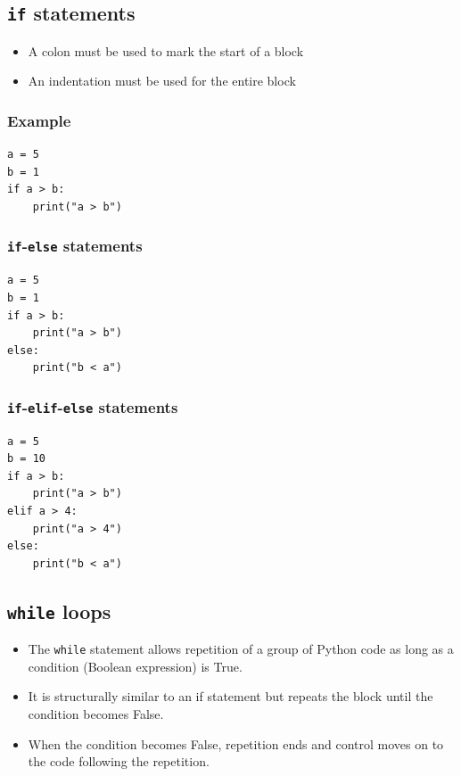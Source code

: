 \documentclass[11pt]{article}
\begin{document}
 \newpage

\subsection{\texttt{if} statements}
\label{sec:org6fc6a0c}
\begin{itemize}
\item A colon must be used to mark the start of a block
\item An indentation must be used for the entire block
\end{itemize}

\subsubsection{Example}
\label{sec:orga4df9d3}
\begin{verbatim}
a = 5
b = 1
if a > b:
    print("a > b")
\end{verbatim}

\subsubsection{\texttt{if}-\texttt{else} statements}
\label{sec:org3017435}
\begin{verbatim}
a = 5
b = 1
if a > b:
    print("a > b")
else:
    print("b < a")
\end{verbatim}

\subsubsection{\texttt{if}-\texttt{elif}-\texttt{else} statements}
\label{sec:org95f72aa}
\begin{verbatim}
a = 5
b = 10
if a > b:
    print("a > b")
elif a > 4:
    print("a > 4")
else:
    print("b < a")
\end{verbatim}

 \newpage

\subsection{\texttt{while} loops}
\label{sec:org629191e}
\begin{itemize}
\item The \texttt{while} statement allows repetition of a group of Python code as long as a condition (Boolean expression) is True.
\item It is structurally similar to an if statement but repeats the block until the condition becomes False.
\item When the condition becomes False, repetition ends and control moves on to the code following the repetition.
\end{itemize}
\end{document}
